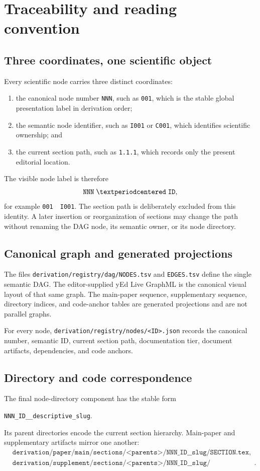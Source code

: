 \section*{Traceability and reading convention}
\label{sec:traceability-convention}

\subsection*{Three coordinates, one scientific object}
Every scientific node carries three distinct coordinates:
\begin{enumerate}
  \item the canonical node number \texttt{NNN}, such as \texttt{001}, which is the stable global presentation label in derivation order;
  \item the semantic node identifier, such as \texttt{I001} or \texttt{C001}, which identifies scientific ownership; and
  \item the current section path, such as \texttt{1.1.1}, which records only the present editorial location.
\end{enumerate}
The visible node label is therefore
\[
  \texttt{NNN}\;\textperiodcentered\;\texttt{ID},
\]
for example \texttt{001}~\textperiodcentered~\texttt{I001}.  The section path is deliberately excluded from this identity.  A later insertion or reorganization of sections may change the path without renaming the DAG node, its semantic owner, or its node directory.

\subsection*{Canonical graph and generated projections}
The files \texttt{derivation/registry/dag/NODES.tsv} and \texttt{EDGES.tsv} define the single semantic DAG.  The editor-supplied yEd Live GraphML is the canonical visual layout of that same graph.  The main-paper sequence, supplementary sequence, directory indices, and code-anchor tables are generated projections and are not parallel graphs.

For every node, \texttt{derivation/registry/nodes/<ID>.json} records the canonical number, semantic ID, current section path, documentation tier, document artifacts, dependencies, and code anchors.

\subsection*{Directory and code correspondence}
The final node-directory component has the stable form
\begin{center}
\texttt{NNN\_ID\_\_descriptive\_slug}.
\end{center}
Its parent directories encode the current section hierarchy.  Main-paper and supplementary artifacts mirror one another:
\begin{align*}
&\texttt{derivation/paper/main/sections/<parents>/NNN\_ID\_\_slug/SECTION.tex},\\
&\texttt{derivation/supplement/sections/<parents>/NNN\_ID\_\_slug/DOCUMENTATION.md}.
\end{align*}

